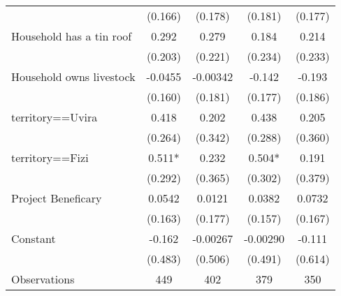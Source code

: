 {\begin{tabular}{l*{4}{c}}
                    &     (0.166)   &     (0.178)   &     (0.181)   &     (0.177)   \\
[1em]
Household has a tin roof&       0.292   &       0.279   &       0.184   &       0.214   \\
                    &     (0.203)   &     (0.221)   &     (0.234)   &     (0.233)   \\
[1em]
Household owns livestock&     -0.0455   &    -0.00342   &      -0.142   &      -0.193   \\
                    &     (0.160)   &     (0.181)   &     (0.177)   &     (0.186)   \\
[1em]
territory==Uvira    &       0.418   &       0.202   &       0.438   &       0.205   \\
                    &     (0.264)   &     (0.342)   &     (0.288)   &     (0.360)   \\
[1em]
territory==Fizi     &       0.511*  &       0.232   &       0.504*  &       0.191   \\
                    &     (0.292)   &     (0.365)   &     (0.302)   &     (0.379)   \\
[1em]
Project Beneficary  &      0.0542   &      0.0121   &      0.0382   &      0.0732   \\
                    &     (0.163)   &     (0.177)   &     (0.157)   &     (0.167)   \\
[1em]
Constant            &      -0.162   &    -0.00267   &    -0.00290   &      -0.111   \\
                    &     (0.483)   &     (0.506)   &     (0.491)   &     (0.614)   \\
\hline
Observations        &         449   &         402   &         379   &         350   \\
\hline\hline
\end{tabular}
}
